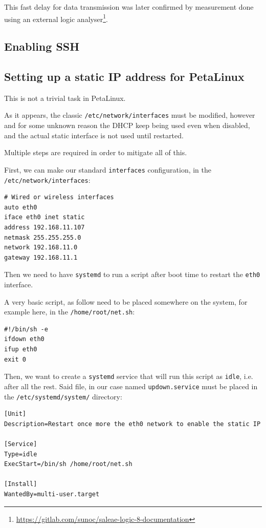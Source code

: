 \documentclass[10pt]{article}
\begin{document}
This fast delay for data transmission was later confirmed by measurement done using an external logic analyser\footnote{\url{https://gitlab.com/sunoc/saleae-logic-8-documentation}\label{org42d2d9c}}.

\subsection{Enabling SSH}
\label{sec:orga376d43}
\subsection{Setting up a static IP address for PetaLinux}
\label{sec:orga167522}
This is not a trivial task in PetaLinux.

As it appears, the classic \texttt{/etc/network/interfaces} must be modified, however and
for some unknown reason the DHCP keep being used even when disabled, and the
actual static interface is not used until restarted.

Multiple steps are required in order to mitigate all of this.

First, we can make our standard \texttt{interfaces} configuration, in the  \texttt{/etc/network/interfaces}:
\begin{verbatim}
# Wired or wireless interfaces
auto eth0
iface eth0 inet static
address 192.168.11.107
netmask 255.255.255.0
network 192.168.11.0
gateway 192.168.11.1
\end{verbatim}

Then we need to have \texttt{systemd} to run a script after boot time to restart the \texttt{eth0} interface.

A very basic script, as follow need to be placed somewhere on the system, for example here, in the \texttt{/home/root/net.sh}:
\begin{verbatim}
#!/bin/sh -e
ifdown eth0
ifup eth0
exit 0
\end{verbatim}

Then, we want to create a \texttt{systemd} service that will run this script as \texttt{idle},
i.e. after all the rest. Said file, in our case named \texttt{updown.service} must be
placed in the \texttt{/etc/systemd/system/} directory:
\begin{verbatim}
[Unit]
Description=Restart once more the eth0 network to enable the static IP

[Service]
Type=idle
ExecStart=/bin/sh /home/root/net.sh

[Install]
WantedBy=multi-user.target
\end{verbatim}
\end{document}
